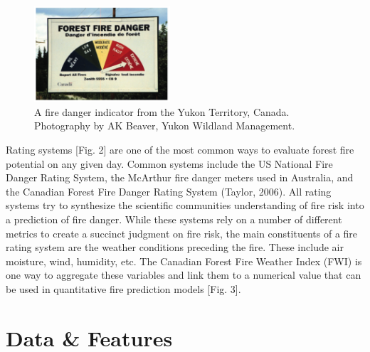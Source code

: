 \documentclass{article}
\begin{document}
\begin{figure}[!ht]
\centering \includegraphics[width=0.45\textwidth]{images/fire_poster.png}
\caption{A fire danger indicator from the Yukon Territory, Canada. Photography by AK Beaver, Yukon Wildland Management.}
\end{figure}

Rating systems [Fig. 2] are one of the most common ways to evaluate forest fire potential on any given day. Common systems include the US National Fire Danger Rating System, the McArthur fire danger meters used in Australia, and the Canadian Forest Fire Danger Rating System (Taylor, 2006). All rating systems try to synthesize the scientific communities understanding of fire risk into a prediction of fire danger. While these systems rely on a number of different metrics to create a succinct judgment on fire risk, the main constituents of a fire rating system are the weather conditions preceding the fire. These include air moisture, wind, humidity, etc. The Canadian Forest Fire Weather Index (FWI) is one way to aggregate these variables and link them to a numerical value that can be used in quantitative fire prediction models [Fig. 3]. 

\section{Data \& Features}
\end{document}
